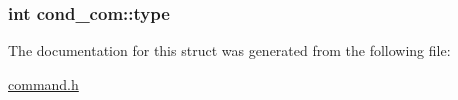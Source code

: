 \subsubsection[{\texorpdfstring{type}{type}}]{\setlength{\rightskip}{0pt plus 5cm}int cond\+\_\+com\+::type}\hypertarget{structcond__com_a664011494f9f9386279500a5d9f8674a}{}\label{structcond__com_a664011494f9f9386279500a5d9f8674a}


The documentation for this struct was generated from the following file\+:\begin{DoxyCompactItemize}
\item 
\hyperlink{command_8h}{command.\+h}\end{DoxyCompactItemize}

